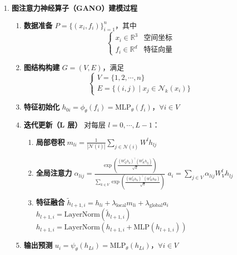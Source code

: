 \documentclass{MMCStyle}
\begin{document}
\begin{enumerate}
    \item \textbf{图注意力神经算子（GANO）建模过程}
    \begin{enumerate}
        \item \textbf{数据准备}
        \(P = \{(x_i, f_i)\}_{i = 1}^n\)，其中
        \[
        \begin{cases} 
        x_i \in \mathbb{R}^3 & \text{空间坐标} \\
        f_i \in \mathbb{R}^d & \text{特征向量}
        \end{cases}
        \]
        \item \textbf{图结构构建}
        \(G = (V, E)\)，满足
        \[
        \begin{cases} 
        V = \{1, 2, \cdots, n\} \\
        E = \{(i, j) \mid x_j \in \mathcal{N}_k(x_i)\}
        \end{cases}
        \]
        \item \textbf{特征初始化}
        \(h_{0i} = \phi_\theta(f_i) = \text{MLP}_\theta(f_i)\)，\(\forall i \in V\)
        \item \textbf{迭代更新（L 层）}
        对每层 \(l = 0, \cdots, L - 1\)：
        \begin{enumerate}
            \item \textbf{局部卷积}
            \(m_{li} = \frac{1}{|\mathcal{N}(i)|} \sum_{j \in \mathcal{N}(i)} W^l h_{lj}\)
            \item \textbf{全局注意力}
            \(\alpha_{lij} = \frac{\exp\left(\frac{(W_Q^l h_{li})^\top (W_K^l h_{lj})}{\sqrt{d}}\right)}{\sum_{k \in V} \exp\left(\frac{(W_Q^l h_{li})^\top (W_K^l h_{lk})}{\sqrt{d}}\right)}\)
            \(a_i = \sum_{j \in V} \alpha_{lij} W_V^l h_{lj}\)
            \item \textbf{特征融合}
            \(\tilde{h}_{l + 1, i} = h_{li} + \lambda_{\text{local}}m_{li} + \lambda_{\text{global}}a_i\)
            \(h_{l + 1, i} = \text{LayerNorm}(\tilde{h}_{l + 1, i})\)
            \(h_{l + 1, i} = \text{LayerNorm}(h_{l + 1, i} + \text{MLP}(h_{l + 1, i}))\)
        \end{enumerate}
        \item \textbf{输出预测}
        \(u_i = \psi_\theta(h_{Li}) = \text{MLP}_\theta(h_{Li})\)，\(\forall i \in V\)
    \end{enumerate}









\end{enumerate}
\end{document}
